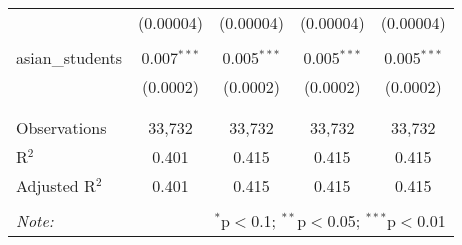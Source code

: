 \begin{table}[!htbp]
\begin{tabular}{@{\extracolsep{-2pt}}lcccc}
  & (0.00004) & (0.00004) & (0.00004) & (0.00004) \\ 
  & & & & \\ 
 asian\_students & 0.007$^{***}$ & 0.005$^{***}$ & 0.005$^{***}$ & 0.005$^{***}$ \\ 
  & (0.0002) & (0.0002) & (0.0002) & (0.0002) \\ 
  & & & & \\ 
\hline \\[-1.8ex] 
Observations & 33,732 & 33,732 & 33,732 & 33,732 \\ 
R$^{2}$ & 0.401 & 0.415 & 0.415 & 0.415 \\ 
Adjusted R$^{2}$ & 0.401 & 0.415 & 0.415 & 0.415 \\ 
\hline 
\hline \\[-1.8ex] 
\textit{Note:}  & \multicolumn{4}{r}{$^{*}$p$<$0.1; $^{**}$p$<$0.05; $^{***}$p$<$0.01} \\ 
\end{tabular} 
\end{table} 
